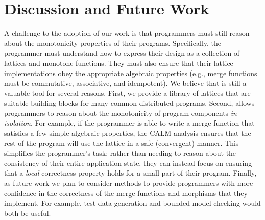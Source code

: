\section{Discussion and Future Work}
\label{sec:discussion}

A challenge to the adoption of our work is that programmers must still reason
about the monotonicity properties of their programs. Specifically, the
programmer must understand how to express their design as a collection of
lattices and monotone functions. They must also ensure that their lattice
implementations obey the appropriate algebraic properties (e.g., merge functions
must be commutative, associative, and idempotent). We believe that \lang is
still a valuable tool for several reasons. First, we provide a library of
lattices that are suitable building blocks for many common distributed
programs. Second, \lang allows programmers to reason about the monotonicity of
program components \emph{in isolation}. For example, if the programmer is able
to write a merge function that satisfies a few simple algebraic properties, the
CALM analysis ensures that the rest of the program will use the lattice in a
safe (convergent) manner. This simplifies the programmer's task: rather than
needing to reason about the consistency of their entire application state, they
can instead focus on ensuring that a \emph{local} correctness property holds for
a small part of their program. Finally, as future work we plan to consider
methods to provide programmers with more confidence in the correctness of the
merge functions and morphisms that they implement. For example, test data
generation and bounded model checking would both be useful.